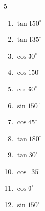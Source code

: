\begin{multicols}{5}
\begin{enumerate}
        \phantom{$\displaystyle =1$}

  \item $\displaystyle \tan{150^\circ}$


  \item $\displaystyle \tan{135^\circ}$

        \phantom{$\displaystyle =-1$}

  \item $\displaystyle \cos{30^\circ}$


  \item $\displaystyle \cos{150^\circ}$


  \item $\displaystyle \cos{60^\circ}$


  \item $\displaystyle \sin{150^\circ}$


  \item $\displaystyle \cos{45^\circ}$


\columnbreak %

  \item $\displaystyle \tan{180^\circ}$

        \phantom{$\displaystyle =0$}

  \item $\displaystyle \tan{30^\circ}$


  \item $\displaystyle \cos{135^\circ}$


  \item $\displaystyle \cos{0^\circ}$

        \phantom{$\displaystyle =1$}

  \item $\displaystyle \sin{150^\circ}$



\end{enumerate}
\end{multicols}
